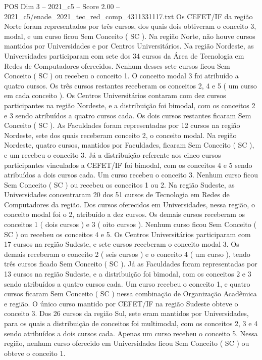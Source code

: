 \begin{textsample}{POS Dim 3 – 2021\_c5 – Score 2.00 – 2021\_c5/enade\_2021\_tec\_red\_comp\_4311331117.txt}
Os CEFET/IF da região Norte foram representados por três cursos, dos quais dois obtiveram o conceito 3, modal, e um curso ficou Sem Conceito ( SC ).
Na região Norte, não houve cursos mantidos por Universidades e por Centros Universitários.
Na região Nordeste, as Universidades participaram com sete dos 34 cursos da Área de Tecnologia em Redes de Computadores oferecidos.
Nenhum desses sete cursos ficou Sem Conceito ( SC ) ou recebeu o conceito 1.
O conceito modal 3 foi atribuído a quatro cursos.
Os três cursos restantes receberam os conceitos 2, 4 e 5 ( um curso em cada conceito ).
Os Centros Universitários contaram com dez cursos participantes na região Nordeste, e a distribuição foi bimodal, com os conceitos 2 e 3 sendo atribuídos a quatro cursos cada.
Os dois cursos restantes ficaram Sem Conceito ( SC ).
As Faculdades foram representadas por 12 cursos na região Nordeste, sete dos quais receberam conceito 2, o conceito modal.
Na região Nordeste, quatro cursos, mantidos por Faculdades, ficaram Sem Conceito ( SC ), e um recebeu o conceito 3.
Já a distribuição referente aos cinco cursos participantes vinculados a CEFET/IF foi bimodal, com os conceitos 4 e 5 sendo atribuídos a dois cursos cada.
Um curso recebeu o conceito 3.
Nenhum curso ficou Sem Conceito ( SC ) ou recebeu os conceitos 1 ou 2.
Na região Sudeste, as Universidades concentraram 20 dos 51 cursos de Tecnologia em Redes de Computadores da região.
Dos cursos oferecidos em Universidades, nessa região, o conceito modal foi o 2, atribuído a dez cursos.
Os demais cursos receberam os conceitos 1 ( dois cursos ) e 3 ( oito cursos ).
Nenhum curso ficou Sem Conceito ( SC ) ou recebeu os conceitos 4 e 5.
Os Centros Universitários participaram com 17 cursos na região Sudeste, e sete cursos receberam o conceito modal 3.
Os demais receberam o conceito 2 ( seis cursos ) e o conceito 4 ( um curso ), tendo três cursos ficado Sem Conceito ( SC ).
Já as Faculdades foram representadas por 13 cursos na região Sudeste, e a distribuição foi bimodal, com os conceitos 2 e 3 sendo atribuídos a quatro cursos cada.
Um curso recebeu o conceito 1, e quatro cursos ficaram Sem Conceito ( SC ) nessa combinação de Organização Acadêmica e região.
O único curso mantido por CEFET/IF na região Sudeste obteve o conceito 3.
Dos 26 cursos da região Sul, sete eram mantidos por Universidades, para os quais a distribuição de conceitos foi multimodal, com os conceitos 2, 3 e 4 sendo atribuídos a dois cursos cada.
Apenas um curso recebeu o conceito 5.
Nessa região, nenhum curso oferecido em Universidades ficou Sem Conceito ( SC ) ou obteve o conceito 1.

\end{textsample}

